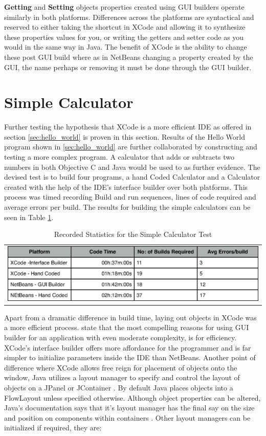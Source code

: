 \documentclass[a4paper,14pt]{article}
\begin{document}
\textbf{Getting} and \textbf{Setting} objects properties created using GUI builders operate similarly in both platforms. Differences across the platforms are syntactical and reserved to either taking the shortcut in XCode and allowing it to synthesize these properties values for you, or writing the getters and setter code as you would in the same way in Java. The benefit of XCode is the ability to change these post GUI build where as in NetBeans changing a property created by the GUI, the name perhaps or removing it must be done through the GUI builder.

\section{Simple Calculator} %
\label{sec:simple_calculator}
Further testing the hypothesis that XCode is a more efficient IDE as offered in section \ref{sec:hello_world} is proven in this section. Results of the Hello World program shown in \ref{sec:hello_world} are further collaborated by constructing and testing a more complex program. A calculator that adds or subtracts two numbers in both Objective C and Java would be used to as further evidence. The devised test is to build four programs, a hand Coded Calculator and a Calculator created with the help of the IDE's interface builder over both platforms. This process was timed recording Build and run sequences, lines of code required and average errors per build. The results for building the simple calculators can be seen in Table \ref{table:simplecalc}. 
\begin{table}[H]
\centering
\begin{tabular}{l}
\includegraphics[scale=0.65]{simplecalculator.eps}
\end{tabular}
\caption{Recorded Statistics for the Simple Calculator Test}
\label{table:simplecalc}
\end{table}
Apart from a dramatic difference in build time, laying out objects in XCode was a more efficient process.  state that the most compelling reasons for using GUI builder for an application with even moderate complexity, is for efficiency. XCode's interface builder offers more affordance for the programmer and is far simpler to initialize parameters inside the IDE than NetBeans. Another point of difference where XCode allows free reign for placement of objects onto the window, Java utilizes a layout manager to specify and control the layout of objects on a JPanel or JContainer \cite{nla.cat-vn3060178}. By default Java places objects into a FlowLayout unless specified otherwise. Although object properties can be altered, Java's documentation says that it's layout manager has the final say on the size and position on components within containers \cite{Oracle2011}. Other layout managers can be initialized if required, they are:
\end{document}
